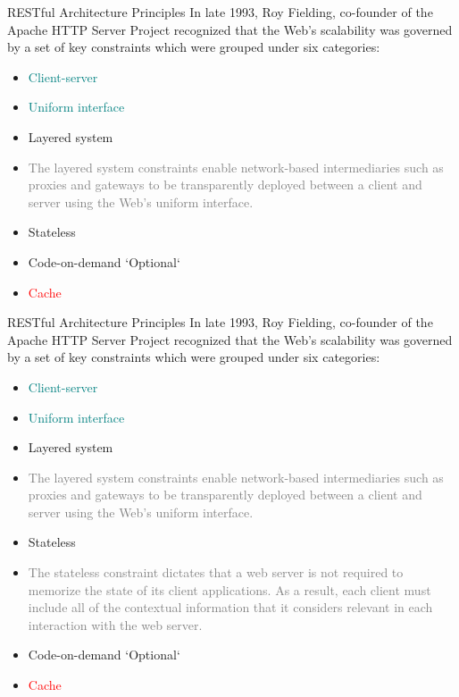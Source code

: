\documentclass{beamer}
\begin{document}
\begin{frame}[t]{RESTful Architecture Principles}
	\scriptsize
	In late 1993, Roy Fielding, co-founder of the Apache HTTP Server Project recognized that the Web’s scalability was governed by a set of key constraints which were grouped under six categories:
	\begin{itemize}
    	\item \textcolor{teal}{Client-server}
    	\item \textcolor{teal}{Uniform interface}

    	\item Layered system
    	\item[] \textcolor{gray}{\tiny The layered system constraints enable network-based intermediaries such as proxies and gateways to be transparently deployed between a client and server using the Web’s uniform interface.} 
    	
    	\item Stateless
    	\item Code-on-demand `Optional`
    	\item \textcolor{red} {Cache}
	\end{itemize}
\end{frame}


\begin{frame}[t]{RESTful Architecture Principles}
	\scriptsize
	In late 1993, Roy Fielding, co-founder of the Apache HTTP Server Project recognized that the Web’s scalability was governed by a set of key constraints which were grouped under six categories:
	\begin{itemize}
    	\item \textcolor{teal}{Client-server}
    	\item \textcolor{teal}{Uniform interface}

    	\item Layered system
    	\item[] \textcolor{gray}{\tiny The layered system constraints enable network-based intermediaries such as proxies and gateways to be transparently deployed between a client and server using the Web’s uniform interface.} 
    	
    	\item Stateless
    	\item[] \textcolor{gray}{ \tiny The stateless constraint dictates that a web server is not required to memorize the state of its client applications. As a result, each client must include all of the contextual information that it considers relevant in each interaction with the web server. }
    	
    	\item Code-on-demand `Optional`
    	\item \textcolor{red} {Cache}
	\end{itemize}
\end{frame}
\end{document}
